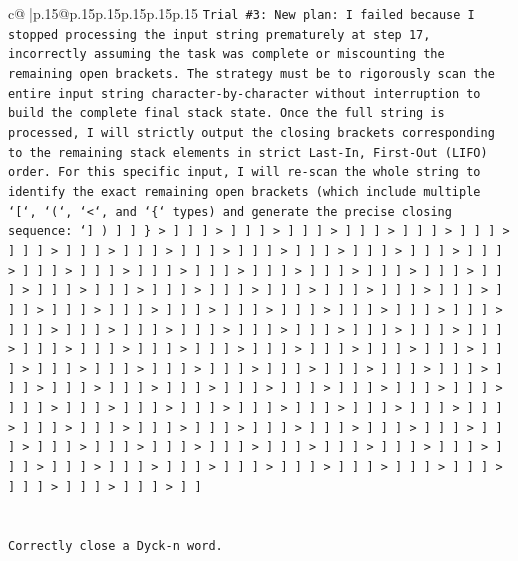\documentclass{article}
\begin{document}
{\begin{supertabular}{c@{$\;$}|p{.15\linewidth}@{}p{.15\linewidth}p{.15\linewidth}p{.15\linewidth}p{.15\linewidth}p{.15\linewidth}}
{{{\texttt{Trial \#3: New plan: I failed because I stopped processing the input string prematurely at step 17, incorrectly assuming the task was complete or miscounting the remaining open brackets. The strategy must be to rigorously scan the entire input string character{-}by{-}character without interruption to build the complete final stack state. Once the full string is processed, I will strictly output the closing brackets corresponding to the remaining stack elements in strict Last{-}In, First{-}Out (LIFO) order. For this specific input, I will re{-}scan the whole string to identify the exact remaining open brackets (which include multiple `{[}`, `(`, `<`, and `\{` types) and generate the precise closing sequence: `{]} ) {]} {]} \} > {]} {]} {]} > {]} {]} {]} > {]} {]} {]} > {]} {]} {]} > {]} {]} {]} > {]} {]} {]} > {]} {]} {]} > {]} {]} {]} > {]} {]} {]} > {]} {]} {]} > {]} {]} {]} > {]} {]} {]} > {]} {]} {]} > {]} {]} {]} > {]} {]} {]} > {]} {]} {]} > {]} {]} {]} > {]} {]} {]} > {]} {]} {]} > {]} {]} {]} > {]} {]} {]} > {]} {]} {]} > {]} {]} {]} > {]} {]} {]} > {]} {]} {]} > {]} {]} {]} > {]} {]} {]} > {]} {]} {]} > {]} {]} {]} > {]} {]} {]} > {]} {]} {]} > {]} {]} {]} > {]} {]} {]} > {]} {]} {]} > {]} {]} {]} > {]} {]} {]} > {]} {]} {]} > {]} {]} {]} > {]} {]} {]} > {]} {]} {]} > {]} {]} {]} > {]} {]} {]} > {]} {]} {]} > {]} {]} {]} > {]} {]} {]} > {]} {]} {]} > {]} {]} {]} > {]} {]} {]} > {]} {]} {]} > {]} {]} {]} > {]} {]} {]} > {]} {]} {]} > {]} {]} {]} > {]} {]} {]} > {]} {]} {]} > {]} {]} {]} > {]} {]} {]} > {]} {]} {]} > {]} {]} {]} > {]} {]} {]} > {]} {]} {]} > {]} {]} {]} > {]} {]} {]} > {]} {]} {]} > {]} {]} {]} > {]} {]} {]} > {]} {]} {]} > {]} {]} {]} > {]} {]} {]} > {]} {]} {]} > {]} {]} {]} > {]} {]} {]} > {]} {]} {]} > {]} {]} {]} > {]} {]} {]} > {]} {]} {]} > {]} {]} {]} > {]} {]} {]} > {]} {]} {]} > {]} {]} {]} > {]} {]} {]} > {]} {]} {]} > {]} {]} {]} > {]} {]} {]} > {]} {]} {]} > {]} {]} {]} > {]} {]} {]} > {]} {]} {]} > {]} {]} {]} > {]} {]} {]} > {]} {]} {]} > {]} {]} {]} > {]} {]} {]} > {]} {]} {]} > {]} {]} {]} > {]} {]} {]} > {]} {]} {]} > {]} {]} {]} > {]} {]} {]} > {]} {]} {]} > {]} {]} {]} > {]} {]} {]} > {]} {]} {]} > {]} {]} {]} > {]} {]} {]} > {]} {]} {]} > {]} {]} {]} > {]} {]} {]} > {]} {]} {]} > {]} {]} {]} > {]} {]} {]} > {]} {]} {]} > {]} {]} {]} > {]} {]} {]} > {]} {]}} \\
\\ 
\\ 
\texttt{Correctly close a Dyck{-}n word.} \\
\\ 
}}}
\end{supertabular}}
\end{document}
